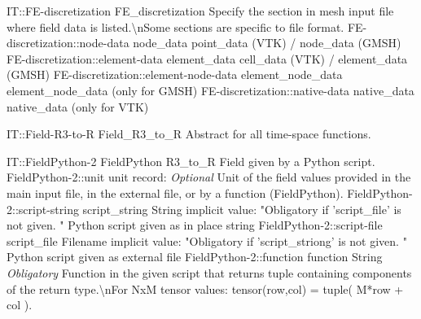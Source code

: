 \begin{SelectionType}
	{IT::FE-discretization}
	{FE{\_}discretization}
	{{{Specify the section in mesh input file where field data is listed.{\textbackslash}nSome sections are specific to file format.}%
}}
		\SelectionItem
			{FE-discretization::node-data}
			{node{\_}data}
			{{{point{\_}data (VTK) / node{\_}data (GMSH)}%
}}
		\SelectionItem
			{FE-discretization::element-data}
			{element{\_}data}
			{{{cell{\_}data (VTK) / element{\_}data (GMSH)}%
}}
		\SelectionItem
			{FE-discretization::element-node-data}
			{element{\_}node{\_}data}
			{{{element{\_}node{\_}data (only for GMSH)}%
}}
		\SelectionItem
			{FE-discretization::native-data}
			{native{\_}data}
			{{{native{\_}data (only for VTK)}%
}}
\end{SelectionType}
\begin{AbstractType}
	{IT::Field-R3-to-R}
	{Field{\_}R3{\_}to{\_}R}
	{}
	{{{Abstract for all time-space functions.}%
}}
\end{AbstractType}
\begin{RecordType}
	{IT::FieldPython-2}
	{FieldPython}
	{}%
	{}%
	{{{R3{\_}to{\_}R Field given by a Python script.}%
}}
		\RecKey
			{FieldPython-2::unit}
			{unit}
			{{record: }}{}
			{ \it{Optional}}
			{{{Unit of the field values provided in the main input file, in the external file, or by a function (FieldPython).}%
}}
		\RecKey
			{FieldPython-2::script-string}
			{script{\_}string}
			{{String}}{}
			{implicit value: "{Obligatory if 'script{\_}file' is not given. }"}
			{{{Python script given as in place string}%
}}
		\RecKey
			{FieldPython-2::script-file}
			{script{\_}file}
			{{Filename}}{}
			{implicit value: "{Obligatory if 'script{\_}striong' is not given. }"}
			{{{Python script given as external file}%
}}
		\RecKey
			{FieldPython-2::function}
			{function}
			{{String}}{}
			{ \it{Obligatory}}
			{{{Function in the given script that returns tuple containing components of the return type.{\textbackslash}nFor NxM tensor values: tensor(row,col) = tuple( M*row + col ).}%
}}
\end{RecordType}

